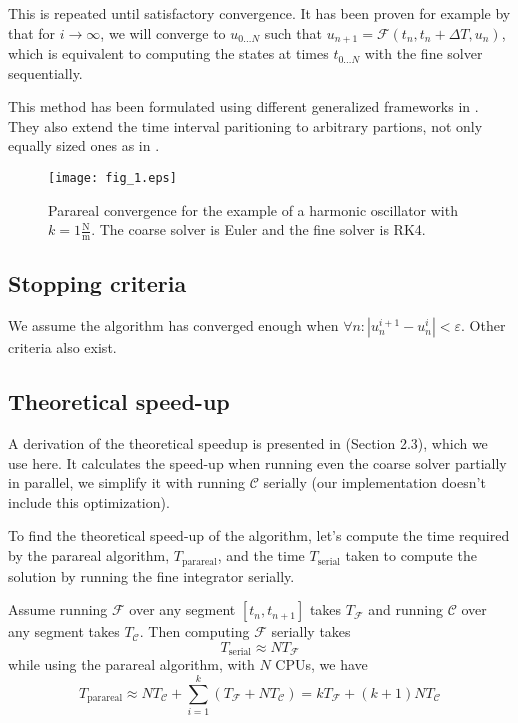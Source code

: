 \documentclass[conference]{IEEEtran}
\begin{document}
This is repeated until satisfactory convergence. It has been proven for example by \cite{parareal2} that for $i \to \infty$, we will converge to $u_{0\dots N}$ such that $u_{n+1} = \mathcal{F}(t_n, t_n+\Delta T, u_n)$, which is equivalent to computing the states at times $t_{0\dots N}$ with the fine solver sequentially.

This method has been formulated using different generalized frameworks in \cite{parareal2}. They also extend the time interval paritioning to arbitrary partions, not only equally sized ones as in \cite{parareal}.

\begin{figure}[htbp]
\centerline{\texttt{[image: fig\_1.eps]}}
\caption{Parareal convergence for the example of a harmonic oscillator with $k = 1\frac{\text{N}}{\text{m}}$. The coarse solver is Euler and the fine solver is RK4.}
\label{oscillator}
\end{figure}

\subsection*{Stopping criteria}
We assume the algorithm has converged enough when $\forall n: |u^{i+1}_n - u^i_n| < \varepsilon$. Other criteria also exist.\cite{speedup}

\subsection*{Theoretical speed-up}

A derivation of the theoretical speedup is presented in \cite{speedup} (Section 2.3), which we use here. It calculates the speed-up when running even the coarse solver partially in parallel, we simplify it with running $\mathcal{C}$ serially (our implementation doesn't include this optimization). 

To find the theoretical speed-up of the algorithm, let's compute the time required by the parareal algorithm, $T_\text{parareal}$, and the time $T_\text{serial}$ taken to compute the solution by running the fine integrator serially. 

Assume running $\mathcal{F}$ over any segment $[t_n, t_{n+1}]$ takes $T_\mathcal{F}$ and running $\mathcal{C}$ over any segment takes $T_\mathcal{C}$. Then computing $\mathcal{F}$ serially takes
$$
T_\text{serial} \approx NT_\mathcal{F}
$$
while using the parareal algorithm, with $N$ CPUs, we have
$$
T_\text{parareal} \approx NT_\mathcal{C} + \sum_{i=1}^{k}\left(T_\mathcal{F} + NT_\mathcal{C}\right) = kT_\mathcal{F} + (k+1)NT_\mathcal{C}
$$
\end{document}
